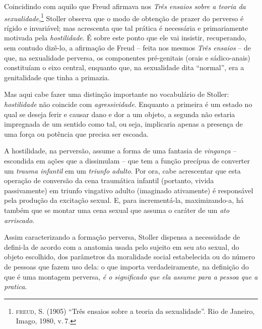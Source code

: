 Coincidindo com aquilo que Freud afirmava nos \emph{Três ensaios sobre a
teoria da sexualidade},\footnote{\textsc{freud}, \textsc{S}. (1905) ``Três
  ensaios sobre a teoria da sexualidade''.  Rio de Janeiro,
  Imago, 1980, v.\,7.} Stoller observa que o modo de obtenção de prazer do
perverso é rígido e invariável; mas acrescenta que tal prática é
necessária e primariamente motivada pela \emph{hostilidade}. É sobre
este ponto que ele vai insistir, recuperando, sem contudo dizê-lo, a
afirmação de Freud -- feita nos mesmos \emph{Três ensaios} -- de que, na
sexualidade perversa, os componentes pré-genitais (orais e sádico-anais)
constituíam o eixo central, enquanto que, na sexualidade dita
``normal'', era a genitalidade que tinha a primazia.

Mas aqui cabe fazer uma distinção importante no vocabulário de Stoller:
\emph{hostilidade} não coincide com \emph{agressividade}. Enquanto a
primeira é um estado no qual se deseja ferir e causar dano e dor a um
objeto, a segunda não estaria impregnada de um sentido como tal, ou
seja, implicaria apenas a presença de uma força ou potência que precisa
ser escoada.

A hostilidade, na perversão, assume a forma de uma fantasia de
\emph{vingança} -- escondida em ações que a dissimulam -- que tem a
função precípua de converter um \emph{trauma infantil} em um
\emph{triunfo adulto}. Por ora, cabe acrescentar que esta operação de
conversão da cena traumática infantil (portanto, vivida passivamente) em
triunfo vingativo adulto (imaginado ativamente) é responsável pela
produção da excitação sexual. E, para incrementá-la, maximizando-a, há
também que se montar uma cena sexual que assuma o caráter de um
\emph{ato arriscado}.

Assim caracterizando a formação perversa, Stoller dispensa a necessidade
de defini-la de acordo com a anatomia usada pelo sujeito em seu ato
sexual, do objeto escolhido, dos parâmetros da moralidade social
estabelecida ou do número de pessoas que fazem uso dela: o que importa
verdadeiramente, na definição do que é uma montagem perversa, \emph{é o
significado que ela assume para a pessoa que a pratica}.

